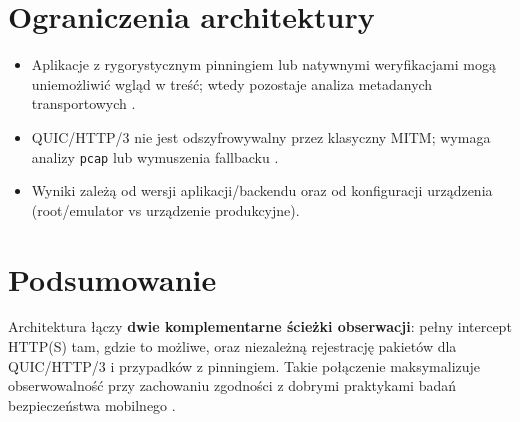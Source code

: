 \section{Ograniczenia architektury}
\begin{itemize}
  \item Aplikacje z rygorystycznym pinningiem lub natywnymi weryfikacjami mogą uniemożliwić wgląd w treść; wtedy pozostaje analiza metadanych transportowych \cite{OWASPMASTGPinning}.
  \item QUIC/HTTP/3 nie jest odszyfrowywalny przez klasyczny MITM; wymaga analizy \texttt{pcap} lub wymuszenia fallbacku \cite{RFC9114}.
  \item Wyniki zależą od wersji aplikacji/backendu oraz od konfiguracji urządzenia (root/emulator vs urządzenie produkcyjne).
\end{itemize}

\section{Podsumowanie}
Architektura łączy \textbf{dwie komplementarne ścieżki obserwacji}: pełny intercept HTTP(S) tam, gdzie to możliwe, oraz niezależną rejestrację pakietów dla QUIC/HTTP/3 i przypadków z pinningiem. Takie połączenie maksymalizuje obserwowalność przy zachowaniu zgodności z dobrymi praktykami badań bezpieczeństwa mobilnego \cite{OWASPMASTGIntercept,OWASPMASTGPinning,MitmproxyDocs,WiresharkDocs,tcpdump,RFC8446,RFC9113,RFC9114,RFC9000}.
